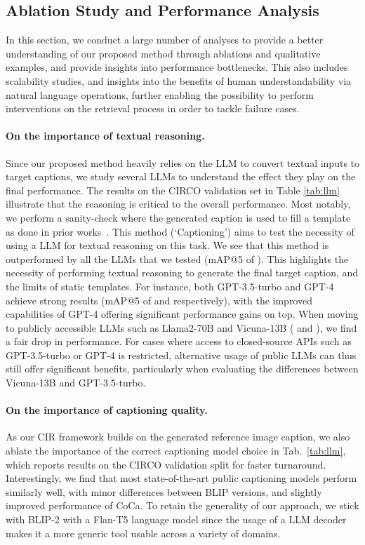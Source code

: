 \documentclass{article} \usepackage{iclr2024_conference,times}
\begin{document}
\subsection{Ablation Study and Performance Analysis}
\label{subsec:analysis}
In this section, we conduct a large number of analyses to provide a better understanding of our proposed method through ablations and qualitative examples, and provide insights into performance bottlenecks. This also includes scalability studies, and insights into the benefits of human understandability via natural language operations, further enabling the possibility to perform interventions on the retrieval process in order to tackle failure cases.

\paragraph{On the importance of textual reasoning.} Since our proposed method heavily relies on the LLM to convert textual inputs to target captions, we study several LLMs to understand the effect they play on the final performance. The results on the CIRCO validation set in Table \ref{tab:llm} illustrate that the reasoning is critical to the overall performance. Most notably, we perform a sanity-check where the generated caption is used to fill a template as done in prior works~\citep{pic2word,searle}. This method (`Captioning') aims to test the necessity of using a LLM for textual reasoning on this task. We see that this method is outperformed by all the LLMs that we tested (mAP@5 of ). This highlights the necessity of performing textual reasoning to generate the final target caption, and the limits of static templates. For instance, both GPT-3.5-turbo and GPT-4 achieve strong results (mAP@5 of  and  respectively), with the improved capabilities of GPT-4 offering significant performance gains on top. When moving to publicly accessible LLMs such as Llama2-70B and Vicuna-13B ( and ), we find a fair drop in performance. For cases where access to closed-source APIs such as GPT-3.5-turbo or GPT-4 is restricted, alternative usage of public LLMs can thus still offer significant benefits, particularly when evaluating the differences between Vicuna-13B and GPT-3.5-turbo.

\paragraph{On the importance of captioning quality.} As our CIR framework builds on the generated reference image caption, we also ablate the importance of the correct captioning model choice in Tab.~\ref{tab:llm}, which reports results on the CIRCO validation split for faster turnaround. 
Interestingly, we find that most state-of-the-art public captioning models perform similarly well, with minor differences between BLIP versions, and slightly improved performance of CoCa. To retain the generality of our approach, we stick with BLIP-2 with a Flan-T5 language model since the usage of a LLM decoder makes it a more generic tool usable across a variety of domains.
\end{document}
